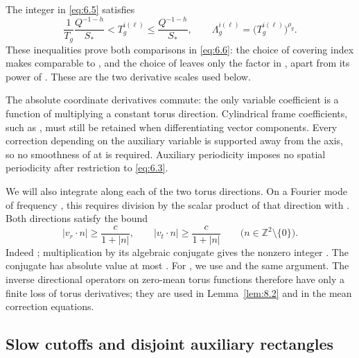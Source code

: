 %
The integer  in \eqref{eq:6.5} satisfies
\[
 \frac1{T_g}\frac{Q^{-1-h}}{S_*}<T_g^{i(\ell)}\le\frac{Q^{-1-h}}{S_*},
 \qquad
 \Lambda_g^{i(\ell)}=\bigl(T_g^{i(\ell)}\bigr)^{\rho_g}.
\]
These inequalities prove both comparisons in \eqref{eq:6.6}: the choice of covering index makes  comparable to , and the choice of  leaves only the factor  in , apart from its power of . These are the two derivative scales used below.

The absolute coordinate derivatives  commute: the only variable coefficient is a function of  multiplying a constant torus direction. Cylindrical frame coefficients, such as , must still be retained when differentiating vector components. Every correction depending on the auxiliary variable is supported away from the axis, so no smoothness of  at  is required. Auxiliary periodicity imposes no spatial periodicity after restriction to \eqref{eq:6.3}.

We will also integrate along each of the two torus directions. On a Fourier mode of frequency , this requires division by the scalar product of that direction with . Both directions satisfy the bound
\begin{equation}
 |v_r\mathbin\cdot n|\ge\frac c{1+|n|},
 \qquad
 |v_t\mathbin\cdot n|\ge\frac c{1+|n|}
 \qquad \bigl(n\in\mathbb Z^2\setminus\{0\}\bigr).
 \tag{6.7}\label{eq:6.7}
\end{equation}
Indeed ; multiplication by its algebraic conjugate gives the nonzero integer . The conjugate has absolute value at most . For , we use  and the same argument. The inverse directional operators on zero-mean torus functions therefore have only a finite loss of torus derivatives; they are used in Lemma~\ref{lem:8.2} and in the mean correction equations.

\subsection{Slow cutoffs and disjoint auxiliary rectangles}\label{sec:6.2}

